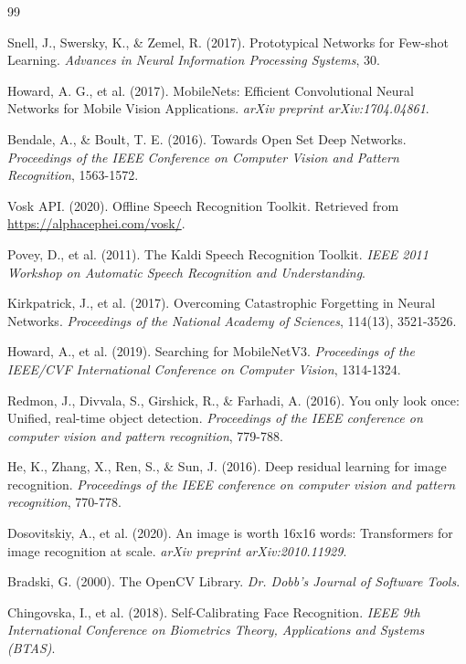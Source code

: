 \documentclass[12pt,a4paper]{report}
\begin{document}
\newpage
\renewcommand{\bibname}{References}
\begin{thebibliography}{99}

Snell, J., Swersky, K., \& Zemel, R. (2017). Prototypical Networks for Few-shot Learning. \textit{Advances in Neural Information Processing Systems}, 30.

Howard, A. G., et al. (2017). MobileNets: Efficient Convolutional Neural Networks for Mobile Vision Applications. \textit{arXiv preprint arXiv:1704.04861}.

Bendale, A., \& Boult, T. E. (2016). Towards Open Set Deep Networks. \textit{Proceedings of the IEEE Conference on Computer Vision and Pattern Recognition}, 1563-1572.

Vosk API. (2020). Offline Speech Recognition Toolkit. Retrieved from \url{https://alphacephei.com/vosk/}.

Povey, D., et al. (2011). The Kaldi Speech Recognition Toolkit. \textit{IEEE 2011 Workshop on Automatic Speech Recognition and Understanding}.

Kirkpatrick, J., et al. (2017). Overcoming Catastrophic Forgetting in Neural Networks. \textit{Proceedings of the National Academy of Sciences}, 114(13), 3521-3526.

Howard, A., et al. (2019). Searching for MobileNetV3. \textit{Proceedings of the IEEE/CVF International Conference on Computer Vision}, 1314-1324.

Redmon, J., Divvala, S., Girshick, R., \& Farhadi, A. (2016). You only look once: Unified, real-time object detection. \textit{Proceedings of the IEEE conference on computer vision and pattern recognition}, 779-788.

He, K., Zhang, X., Ren, S., \& Sun, J. (2016). Deep residual learning for image recognition. \textit{Proceedings of the IEEE conference on computer vision and pattern recognition}, 770-778.

Dosovitskiy, A., et al. (2020). An image is worth 16x16 words: Transformers for image recognition at scale. \textit{arXiv preprint arXiv:2010.11929}.

Bradski, G. (2000). The OpenCV Library. \textit{Dr. Dobb's Journal of Software Tools}.

Chingovska, I., et al. (2018). Self-Calibrating Face Recognition. \textit{IEEE 9th International Conference on Biometrics Theory, Applications and Systems (BTAS)}.


\end{thebibliography}
\end{document}
